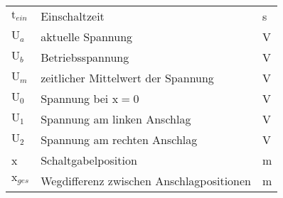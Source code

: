 \begin{table}[H]
\begin{tabular}{p{1.5cm}p{13.5cm}p{1.5cm}}
			$\text{t}_{ein}$ \dotfill& Einschaltzeit & s\\
			$\text{U}_a$ \dotfill& aktuelle Spannung & V\\
			$\text{U}_b$ \dotfill& Betriebsspannung & V\\
			$\text{U}_m$ \dotfill& zeitlicher Mittelwert der Spannung & V\\
			$\text{U}_0$ \dotfill& Spannung bei $\text{x}=0$& V\\
			$\text{U}_1$ \dotfill& Spannung am linken Anschlag & V\\
			$\text{U}_2$ \dotfill& Spannung am rechten Anschlag & V\\
			x \dotfill& Schaltgabelposition & m\\
			$\text{x}_{ges}$ \dotfill& Wegdifferenz zwischen Anschlagpositionen & m\\
			
			
			\end{tabular}	
\end{table}

